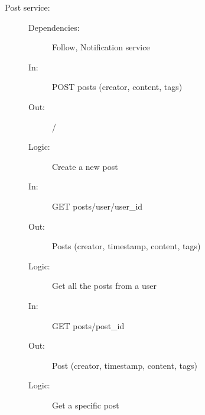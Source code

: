 \documentclass{article}
\begin{document}
\begin{description}
    \item [Post service:]
    \begin{description}
        \item[]
        \item[Dependencies:] Follow, Notification service
    \end{description}
    \begin{description}
        \item[]
        \item[In:] POST posts (creator, content, tags)
        \item[Out:] /
        \item[Logic:] Create a new post
        \item[]

        \item[In:] GET posts/user/user\_id
        \item[Out:] Posts (creator, timestamp, content, tags)
        \item[Logic:] Get all the posts from a user
        \item[]

        \item[In:] GET posts/post\_id
        \item[Out:] Post (creator, timestamp, content, tags)
        \item[Logic:] Get a specific post
    \end{description}
\end{description}
\end{document}
